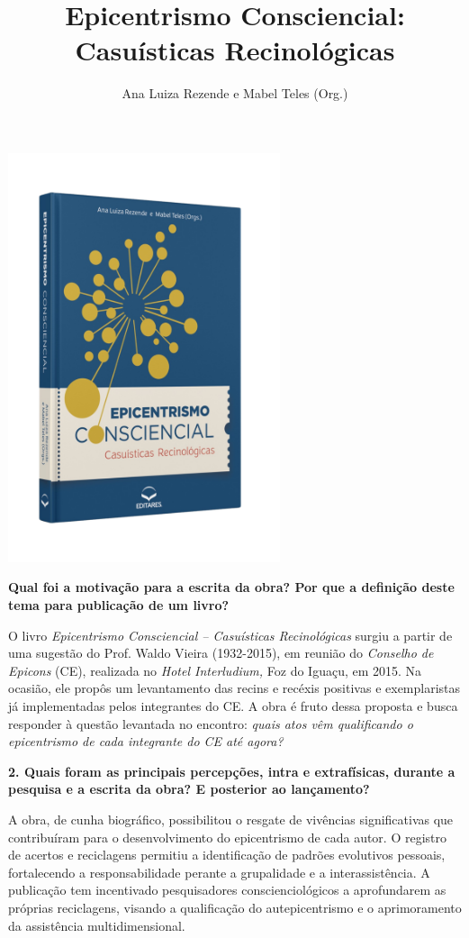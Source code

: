 \documentclass{gescons}
\author{Ana Luiza Rezende e Mabel Teles (Org.)}
\title{Epicentrismo Consciencial: Casuísticas Recinológicas}
\begin{document}
    \makeentrevistatitle

    \begin{multicols}{2}


\begin{center}
    \includegraphics[width=8cm]{articles/entrevista/mockups/Mabel-e-Ana-Luiza.png}
\end{center}

\textbf{Qual foi a motivação para a escrita da obra? Por que a definição deste tema para publicação de um livro?}


O livro \textit{Epicentrismo Consciencial – Casuísticas Recinológicas} surgiu a partir de uma sugestão do Prof. Waldo Vieira (1932-2015), em reunião do \textit{Conselho de Epicons} (CE), realizada no \textit{Hotel Interludium,} Foz do Iguaçu, em 2015. Na ocasião, ele propôs um levantamento das recins e recéxis positivas e exemplaristas já implementadas pelos integrantes do CE. A obra é fruto dessa proposta e busca responder à questão levantada no encontro: \textit{quais atos vêm qualificando o epicentrismo de cada integrante do CE até agora? }

\textbf{2. Quais foram as principais percepções, intra e extrafísicas, durante a pesquisa e a escrita da obra? E posterior ao lançamento?}

A obra, de cunha biográfico, possibilitou o resgate de vivências significativas que contribuíram para o desenvolvimento do epicentrismo de cada autor. O registro de acertos e reciclagens permitiu a identificação de padrões evolutivos pessoais, fortalecendo a responsabilidade perante a grupalidade e a interassistência. A publicação tem incentivado pesquisadores conscienciológicos a aprofundarem as próprias reciclagens, visando a qualificação do autepicentrismo e o aprimoramento da assistência multidimensional.  


\end{multicols}
\end{document}

